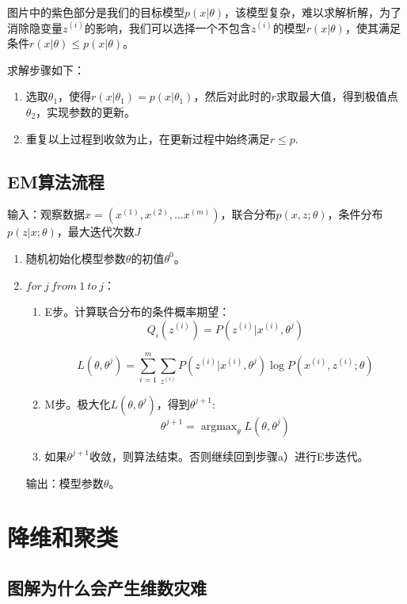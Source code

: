 图片中的紫色部分是我们的目标模型$p(x|\theta)$，该模型复杂，难以求解析解，为了消除隐变量$z^{(i)}$的影响，我们可以选择一个不包含$z^{(i)}$的模型$r(x|\theta)$，使其满足条件$r(x|\theta) \leqslant p(x|\theta) $。

求解步骤如下：

\begin{enumerate}\itemsep0em
		\item 选取$\theta_1$，使得$r(x|\theta_1) = p(x|\theta_1)$，然后对此时的$r$求取最大值，得到极值点$\theta_2$，实现参数的更新。
		\item 重复以上过程到收敛为止，在更新过程中始终满足$r \leqslant p $.
\end{enumerate}

\subsection{EM算法流程}

输入：观察数据$x=(x^{(1)},x^{(2)},...x^{(m)})$，联合分布$p(x,z ;\theta)$，条件分布$p(z|x; \theta)$，最大迭代次数$J$

\begin{enumerate}\itemsep0em
		\item 随机初始化模型参数$\theta$的初值$\theta^0$。
		\item $for \ j  \ from \ 1  \ to  \ j$：

		\begin{enumerate}\itemsep0em
				\item  E步。计算联合分布的条件概率期望：
					$$
				Q_i(z^{(i)}) = P( z^{(i)}|x^{(i)}, \theta^{j})
				$$

				$$
				L(\theta, \theta^{j}) = \sum\limits_{i=1}^m\sum\limits_{z^{(i)}}P( z^{(i)}|x^{(i)}, \theta^{j})\log{P(x^{(i)}, z^{(i)};\theta)}
				$$

			\item M步。极大化$L(\theta, \theta^{j})$，得到$\theta^{j+1}$:
				$$
				\theta^{j+1} = \mathop{\arg\max}_\theta L(\theta, \theta^{j})
				$$
			\item 如果$\theta^{j+1}$收敛，则算法结束。否则继续回到步骤a）进行E步迭代。
		\end{enumerate}
		输出：模型参数$\theta$。
\end{enumerate}


\section{降维和聚类}


\subsection{图解为什么会产生维数灾难}

